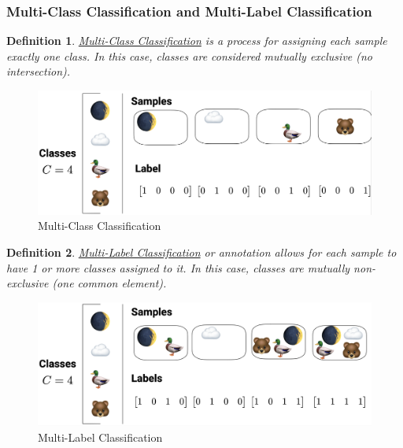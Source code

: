 \documentclass[11pt,a4paper]{article}
\newtheorem{definition}{Definition}
\begin{document}
\subsubsection{Multi-Class Classification and Multi-Label Classification}
\begin{definition}
    \underline{Multi-Class Classification} is a process for assigning each sample exactly one class. In this case, classes are considered mutually exclusive (no intersection).
\end{definition}
\begin{center}\begin{figure}[htbp]
    \centering
    \includegraphics[scale=0.13]{multi-class.png}
    \caption{Multi-Class Classification}
    \label{}
\end{figure}\end{center}
\begin{definition}
    \underline{Multi-Label Classification} or annotation allows for each sample to have 1 or more classes assigned to it. In this case, classes are mutually non-exclusive (one common element).
\end{definition}
\begin{center}\begin{figure}[htbp]
    \centering
    \includegraphics[scale=0.13]{multi-label.png}
    \caption{Multi-Label Classification}
    \label{}
\end{figure}\end{center}
\end{document}
